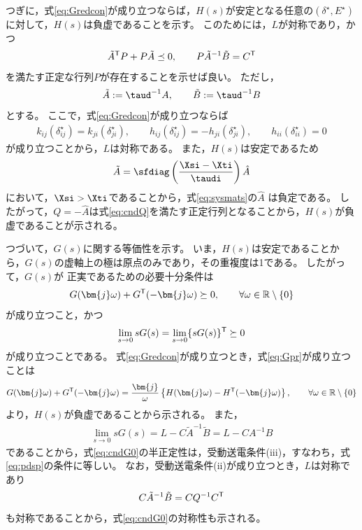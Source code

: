 \documentclass[tombow,dvipdfmx]{corona-a5-1.1}
\begin{document}
\begin{証明}
つぎに，式\ref{eq:Gredcon}が成り立つならば，$H(s)$が安定となる任意の$(\delta^{\star},E^{\star})$に対して，$H(s)$は負虚であることを示す。
このためには，$L$が対称であり，かつ
\begin{align}\label{eq:cndQ}
\tilde{A}^{\sf T}P + P\tilde{A} \preceq 0
,\qquad
P\tilde{A}^{-1}\tilde{B}=C^{\sf T}
\end{align}
を満たす正定な行列$P$が存在することを示せば良い。
ただし，
\begin{align*}
\tilde{A}:= \taud^{-1}A
,\qquad
\tilde{B}:= \taud^{-1}B
\end{align*}
とする。
ここで，式\ref{eq:Gredcon}が成り立つならば
\begin{align*}
k_{ij}(\delta_{ij}^{\star}) =
k_{ji}(\delta_{ji}^{\star})
,\qquad
h_{ij}(\delta_{ij}^{\star}) = 
- h_{ji}(\delta_{ji}^{\star}),\qquad
h_{ii}(\delta_{ii}^{\star}) = 0
\end{align*}
が成り立つことから，$L$は対称である。
また，$H(s)$は安定であるため
\begin{align*}
\tilde{A} = 
\sfdiag \left( \frac{ \Xsi -  \Xti }{ \taudi } \right)
\hat{A}
\end{align*}
において，$\Xsi > \Xti$であることから，式\ref{eq:sysmats}の$\hat{A}$
は負定である。
したがって，$Q=-\hat{A}$は式\ref{eq:cndQ}を満たす正定行列となることから，$H(s)$が負虚であることが示される。


つづいて，$G(s)$に関する等価性を示す。
いま，$H(s)$は安定であることから，$G(s)$の虚軸上の極は原点のみであり，その重複度は1である。
したがって，$G(s)$が
正実であるための必要十分条件は
\begin{align}\label{eq:Gpr}
G(\bm{j}\omega) + G^{\sf T}(-\bm{j}\omega) \succeq 0
,\qquad \forall \omega \in \mathbb{R}\setminus\{0\}
\end{align}
が成り立つこと，かつ
\begin{align}\label{eq:cndG0}
\lim_{s\rightarrow 0} s G(s) = \lim_{s\rightarrow 0} \{ s G(s)\}^{\sf T}\succeq 0
\end{align}
が成り立つことである。
式\ref{eq:Gredcon}が成り立つとき，式\ref{eq:Gpr}が成り立つことは
\begin{align}\label{eq:NIineq}
G(\bm{j}\omega) + G^{\sf T}(-\bm{j}\omega)
=
\frac{\bm{j}}{\omega} \left\{
H(\bm{j}\omega) - H^{\sf T}(-\bm{j}\omega)
\right\}
,\qquad \forall \omega \in \mathbb{R}\setminus\{0\}
\end{align}
より，$H(s)$が負虚であることから示される。
また，
\begin{align*}
\lim_{s\rightarrow 0} s G(s) =
L - C\tilde{A}^{-1}\tilde{B} = L - C A^{-1} B
\end{align*}
であることから，式\ref{eq:cndG0}の半正定性は，受動送電条件(iii)，すなわち，式\ref{eq:pdsp}の条件に等しい。
なお，受動送電条件(ii)が成り立つとき，$L$は対称であり
\begin{align*}
C\tilde{A}^{-1}\tilde{B} = C Q^{-1} C^{\sf T}
\end{align*}
も対称であることから，式\ref{eq:cndG0}の対称性も示される。


\end{証明}
\end{document}
